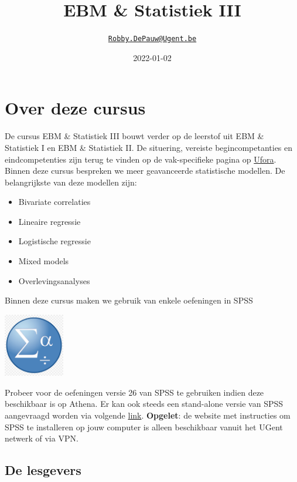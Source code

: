\documentclass[
]{book}
\title{EBM \& Statistiek III}
\author{\href{mailto:Robby.DePauw@Ugent.be}{\nolinkurl{Robby.DePauw@Ugent.be}}}
\date{2022-01-02}
\providecommand{\tightlist}{%
  \setlength{\itemsep}{0pt}\setlength{\parskip}{0pt}}
\theoremstyle{definition}
\theoremstyle{definition}
\theoremstyle{definition}
\theoremstyle{definition}
\theoremstyle{remark}
\begin{document}
\maketitle

{
\setcounter{tocdepth}{2}
\tableofcontents
}
\hypertarget{over-deze-cursus}{%
\chapter*{Over deze cursus}\label{over-deze-cursus}}


De cursus {EBM \& Statistiek III} bouwt verder op de leerstof uit {EBM \& Statistiek I} en {EBM \& Statistiek II}. De situering, vereiste begincompetanties en eindcompetenties zijn terug te vinden op de vak-specifieke pagina op \href{https://ufora.ugent.be}{Ufora}. Binnen deze cursus bespreken we meer geavanceerde statistische modellen. De belangrijkste van deze modellen zijn:

\begin{itemize}
\tightlist
\item
  Bivariate correlaties
\item
  Lineaire regressie
\item
  Logistische regressie
\item
  Mixed models
\item
  Overlevingsanalyses
\end{itemize}

Binnen deze cursus maken we gebruik van enkele oefeningen in {SPSS}

\includegraphics[width=1.04167in,height=\textheight]{img/spss.png}

Probeer voor de oefeningen versie 26 van {SPSS} te gebruiken indien deze beschikbaar is op Athena. Er kan ook steeds een stand-alone versie van {SPSS} aangevraagd worden via volgende \href{https://helpdesk.ugent.be/athena/}{link}. \textbf{Opgelet}: de website met instructies om {SPSS} te installeren op jouw computer is alleen beschikbaar vanuit het UGent netwerk of via VPN.

\hypertarget{de-lesgevers}{%
\section*{De lesgevers}\label{de-lesgevers}}
\end{document}
